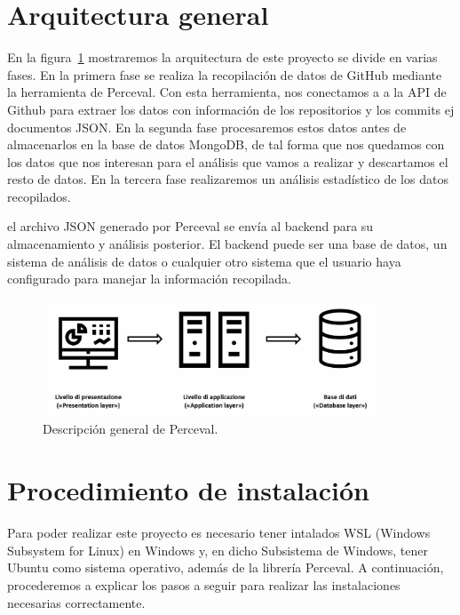 \documentclass[a4paper, 12pt]{book}
\begin{document}
\section{Arquitectura general} 
\label{sec:arquitectura}

En la figura~\ref{fig:arquitectura} mostraremos la arquitectura de este proyecto se divide en varias fases. 
En la primera fase se realiza la recopilación de datos de GitHub mediante la herramienta de Perceval. 
Con esta herramienta, nos conectamos a a la API de Github para extraer los datos con información de los repositorios y los commits ej documentos JSON.
En la segunda fase procesaremos estos datos antes de almacenarlos en la base de datos MongoDB, de tal forma que nos quedamos con los datos que nos interesan para el análisis que vamos a realizar y descartamos el resto de datos.
En la tercera fase realizaremos un análisis estadístico de los datos recopilados. 

el archivo JSON generado por Perceval se envía al backend para su almacenamiento y análisis posterior. El backend puede ser una base de datos, un sistema de análisis de datos o cualquier otro sistema que el usuario haya configurado para manejar la información recopilada.
\begin{figure}
  \centering
  \includegraphics[width=10cm, keepaspectratio]{img/arquitectura.png}
  \caption{Descripción general de Perceval.}\label{fig:arquitectura}
\end{figure}


\section{Procedimiento de instalación} %
\label{sec:procedimiento de instalación}

Para poder realizar este proyecto es necesario tener intalados WSL (Windows Subsystem for Linux) en Windows y, en dicho Subsistema de Windows, tener Ubuntu como sistema operativo, además de la librería Perceval. 
A continuación, procederemos a explicar los pasos a seguir para realizar las instalaciones necesarias correctamente.
\end{document}
